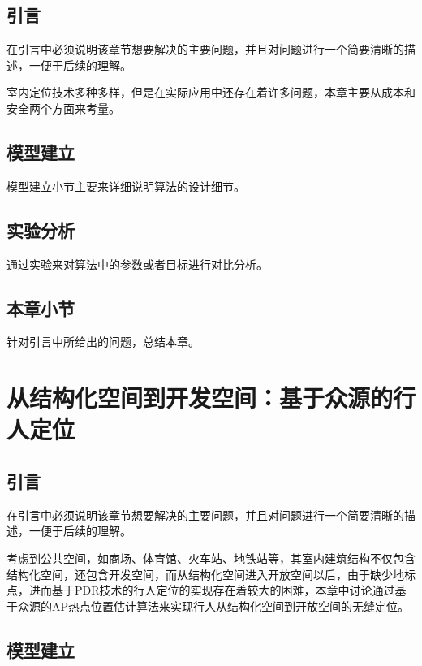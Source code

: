\section{引言}

在引言中必须说明该章节想要解决的主要问题，并且对问题进行一个简要清晰的描述，一便于后续的理解。

室内定位技术多种多样，但是在实际应用中还存在着许多问题，本章主要从成本和安全两个方面来考量。

\section{模型建立}

模型建立小节主要来详细说明算法的设计细节。

\section{实验分析}

通过实验来对算法中的参数或者目标进行对比分析。

\section{本章小节}

针对引言中所给出的问题，总结本章。




\chapter{从结构化空间到开发空间：基于众源的行人定位}

\section{引言}

在引言中必须说明该章节想要解决的主要问题，并且对问题进行一个简要清晰的描述，一便于后续的理解。

考虑到公共空间，如商场、体育馆、火车站、地铁站等，其室内建筑结构不仅包含结构化空间，还包含开发空间，而从结构化空间进入开放空间以后，由于缺少地标点，进而基于PDR技术的行人定位的实现存在着较大的困难，本章中讨论通过基于众源的AP热点位置估计算法来实现行人从结构化空间到开放空间的无缝定位。

\section{模型建立}

